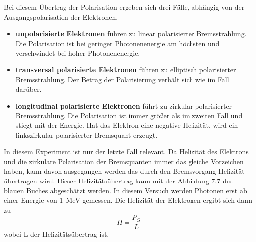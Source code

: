 Bei diesem Übertrag der Polarisation ergeben sich drei Fälle, abhängig von der Ausgangspolarisation der Elektronen. 
\begin{itemize}
    \item \textbf{unpolarisierte Elektronen} führen zu linear polarisierter Bremsstrahlung. Die Polarisation ist bei geringer Photonenenergie am höchsten und verschwindet bei hoher Photonenenergie.
    \item \textbf{transversal polarisierte Elektronen} führen zu elliptisch polarisierter Bremsstrahlung. Der Betrag der Polarisierung verhält sich wie im Fall darüber.
    \item \textbf{longitudinal polarisierte Elektronen} führt zu zirkular polarisierter Bremsstrahlung. Die Polarisation ist immer größer als im zweiten Fall und stiegt mit der Energie. Hat das Elektron eine negative Helizität, wird ein linkszirkular polarisierter Bremsquant erzeugt.
\end{itemize}
    In diesem Experiment ist nur der letzte Fall relevant. Da Helizität des Elektrons und die zirkulare Polarisation der Bremsquanten immer das gleiche Vorzeichen haben, kann davon ausgegangen werden das durch den Bremsvorgang Helizität übertragen wird. Dieser Helizitätsübertrag kann mit der Abbildung 7.7 des blauen Buches \cite{BlueBook} abgeschätzt werden. In diesem Versuch werden Photonen erst ab einer Energie von \SI{1}{MeV} gemessen. 
    Die Helizität der Elektronen ergibt sich dann zu
    \begin{equation}
        H = \frac{P_G}{L}
        \label{Helizität}
    \end{equation}
    wobei L der Helizitätsübertrag ist. 


